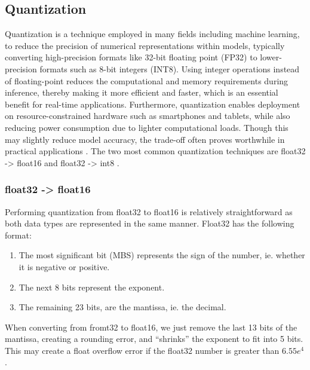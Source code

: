 \documentclass[licencjacka,en]{pracamgr}
\begin{document}
\subsection{Quantization}
Quantization is a technique employed in many fields including machine learning, to reduce the precision of numerical representations within models, typically converting high-precision formats like 32-bit floating point (FP32) to lower-precision formats such as 8-bit integers (INT8). Using integer operations instead of floating-point reduces the computational and memory requirements during inference, thereby making it more efficient and faster, which is an essential benefit for real-time applications. Furthermore, quantization enables deployment on resource-constrained hardware such as smartphones and tablets, while also reducing power consumption due to lighter computational loads. Though this may slightly reduce model accuracy, the trade-off often proves worthwhile in practical applications \cite{ibm_quantization}.
The two most common quantization techniques are float32 -> float16 and float32 -> int8 \cite{quant_hf}.
\subsubsection{float32 -> float16}
Performing quantization from float32 to float16 is relatively straightforward as both data types are represented in the same manner. Float32 has the following format:
\begin{enumerate}
	\item The most significant bit (MBS) represents the sign of the number, ie. whether it is negative or positive.
	\item The next 8 bits represent the exponent.
	\item The remaining 23 bits, are the mantissa, ie. the decimal.
\end{enumerate}

When converting from fromt32 to float16, we just remove the last 13 bits of the mantissa, creating a rounding error, and “shrinks” the exponent to fit into 5 bits. This may create a float overflow error if the float32 number is greater than $ 6.55e^4$ \cite{quant_explained}.
\end{document}
